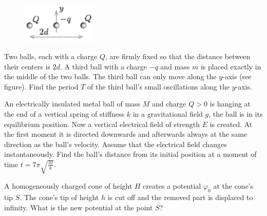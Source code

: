 \documentclass[11pt]{article}
\begin{document}
\probeng
\begin{figure}
	\vspace{-25pt}
	\begin{center}
		\includegraphics[width=0.32\textwidth]{2017-v2g-09-laengudjoonis}
	\end{center}
	\vspace{-10pt}
\end{figure}
Two balls, each with a charge $Q$, are firmly fixed so that the distance between their centers is $2d$. A third ball with a charge $-q$ and mass $m$ is placed exactly in the middle of the two balls. The third ball can only move along the $y$-axis (see figure). Find the period $T$ of the third ball’s small oscillations along the $y$-axis.
\probend
\bigskip


\probeng
An electrically insulated metal ball of mass $M$ and charge $Q>0$ is hanging at the end of a vertical spring of stiffness $k$ in a gravitational field $g$, the ball is in its equilibrium position. Now a vertical electrical field of strength $E$ is created. At the first moment it is directed downwards and afterwards always at the same direction as the ball’s velocity. Assume that the electrical field changes instantaneously. Find the ball’s distance from its initial position at a moment of time $t=7\pi \sqrt{\frac{M}{k}}$.
\probend
\bigskip


\probeng
A homogeneously charged cone of height $H$ creates a potential $\varphi_0$ at the cone’s tip $S$. The cone’s tip of height $h$ is cut off and the removed part is displaced to infinity. What is the new potential at the point $S$?
\probend
\bigskip

\end{document}
